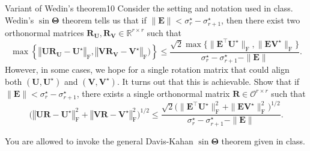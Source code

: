 \documentclass{article}
\begin{document}
\begin{comment}
\solution{

}

	\newpart{10}  Suppose that the observed data $y_{i,j}$ is instead an average of $L$ independent pairwise comparisons, namely, 
	\[
y_{i,j}=\frac{1}{L}\sum_{l=1}^{L}y_{i,j}^{(l)},
\]
	where $y_{i,j}^{(l)}$ are independently generates obeying
	$$y_{i,j}^{(l)} = \begin{cases}
1,\quad & \text{with probability }\frac{w_{j}}{w_{i}+w_{j}}\\
0, & \text{with probability }\frac{w_{i}}{w_{i}+w_{j}}
\end{cases} 
	\qquad \text{provided that }(i,j) \text{ is compared.}
	$$
	Show that $ {\bm{\pi}}$ converges to ${\bm{\pi}}$ as $L\rightarrow \infty$. 

\solution{

}

\end{problem}

\end{comment}


\begin{problem}{Variant of Wedin's theorem}{10}
Consider the setting and notation used in class. Wedin's $\sin \bm{\Theta}$ theorem tells us that if $\|\bm{E}\| < \sigma_{r}^{\star} - \sigma_{r+1}^{\star}$, then there exist two orthonormal matrices $\bm{R}_{\bm{U}}, \bm{R}_{\bm{V}} \in \mathbb{R}^{r \times r}$ such that 
\[
\max\left\{ \left\Vert \bm{U}\bm{R}_{\bm{U}}-\bm{U}^{\star}\right\Vert _{\mathrm{F}} , \left\Vert \bm{V}\bm{R}_{\bm{V}}-\bm{V}^{\star}\right\Vert _{\mathrm{F}}\big)\right\} \leq \frac{\sqrt{2}\max\big\{ \|\bm{E}^{\top}\bm{U}^{\star}\|_{\mathrm{F}},\|\bm{E}\bm{V}^{\star}\|_{\mathrm{F}}\big\} }{\sigma_{r}^{\star}-\sigma_{r+1}^{\star}-\|\bm{E}\|}.
\]
However, in some cases, we hope for a single rotation matrix that could align both $(\bm{U}, \bm{U}^{\star})$ and  $(\bm{V}, \bm{V}^{\star})$. It turns out that this is achievable. Show that if $\|\bm{E}\| < \sigma_{r}^{\star} - \sigma_{r+1}^{\star}$, there exists a single orthonormal matrix $\bm{R} \in \mathcal{O}^{r \times r}$ such that
\[
\big(\left\Vert \bm{U}\bm{R}-\bm{U}^{\star}\right\Vert _{\mathrm{F}}^{2} + \left\Vert \bm{V}\bm{R}-\bm{V}^{\star}\right\Vert _{\mathrm{F}}^{2}\big)^{1/2} \leq \frac{\sqrt{2}\big( \|\bm{E}^{\top}\bm{U}^{\star}\|_{\mathrm{F}}^{2} + \|\bm{E}\bm{V}^{\star}\|_{\mathrm{F}}^{2}\big)^{1/2} }{\sigma_{r}^{\star}-\sigma_{r+1}^{\star}-\|\bm{E}\|}.
\]

You are allowed to invoke the general Davis-Kahan $\sin\bm{\Theta}$ theorem given in class.


\end{problem}
\end{document}
